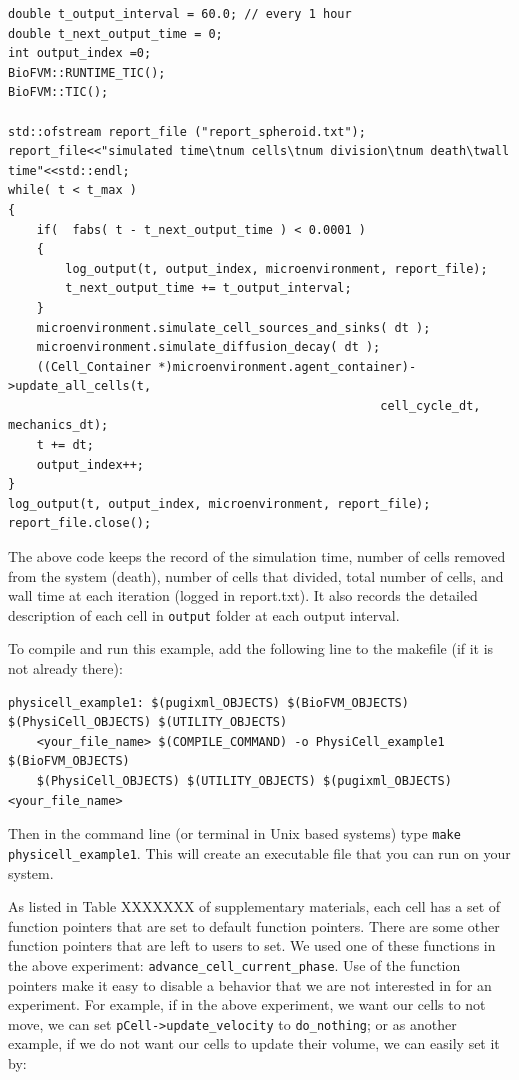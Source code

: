 \documentclass[11pt]{article}
\begin{document}
\begin{verbatim}
double t_output_interval = 60.0; // every 1 hour
double t_next_output_time = 0;
int output_index =0;
BioFVM::RUNTIME_TIC();
BioFVM::TIC();
	
std::ofstream report_file ("report_spheroid.txt");
report_file<<"simulated time\tnum cells\tnum division\tnum death\twall time"<<std::endl;
while( t < t_max )
{
    if(  fabs( t - t_next_output_time ) < 0.0001 )
    {
        log_output(t, output_index, microenvironment, report_file);
        t_next_output_time += t_output_interval;						
    }
    microenvironment.simulate_cell_sources_and_sinks( dt );
    microenvironment.simulate_diffusion_decay( dt );
    ((Cell_Container *)microenvironment.agent_container)->update_all_cells(t, 
                                                    cell_cycle_dt, mechanics_dt);		
    t += dt;
    output_index++;
}
log_output(t, output_index, microenvironment, report_file);
report_file.close();
\end{verbatim}

The above code keeps the record of the simulation time, number of cells removed from the system (death),
number of cells that divided, total number of cells, and wall time at each iteration (logged in report.txt).
It also records the detailed description of each cell in \verb:output: folder at each output interval.

To compile and run this example, add the following line to the makefile (if it is not already there):

\begin{verbatim}
physicell_example1: $(pugixml_OBJECTS) $(BioFVM_OBJECTS) $(PhysiCell_OBJECTS) $(UTILITY_OBJECTS) 
    <your_file_name> $(COMPILE_COMMAND) -o PhysiCell_example1 $(BioFVM_OBJECTS)
    $(PhysiCell_OBJECTS) $(UTILITY_OBJECTS) $(pugixml_OBJECTS) <your_file_name>
\end{verbatim}

Then in the command line (or terminal in Unix based systems) type \verb:make physicell_example1:. This will create
an executable file that you can run on your system. 

As listed in Table XXXXXXX of supplementary materials, each cell has a set of function pointers that are set
to default function pointers. There are some other function pointers that are left to users to set. We used one
of these functions in the above experiment: \verb:advance_cell_current_phase:. Use of the function pointers make it easy to
disable a behavior that we are not interested in for an experiment. For example, if in the above experiment, we
want our cells to not move, we can set \verb:pCell->update_velocity: to \verb:do_nothing:; or as another example,
if we do not want our cells to update their volume, we can easily set it by:
\end{document}
